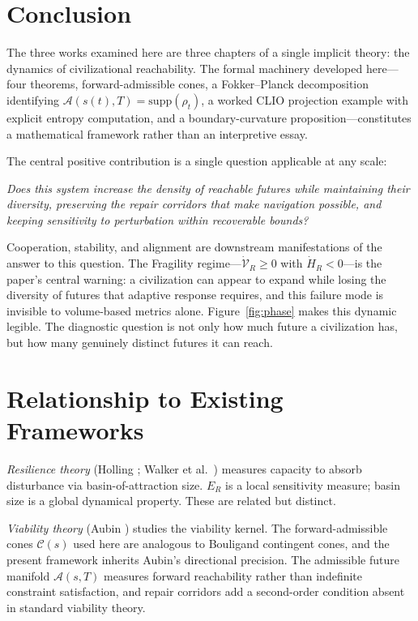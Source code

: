 \documentclass[12pt, a4paper]{article}
\theoremstyle{plain}
\theoremstyle{definition}
\theoremstyle{remark}
\begin{document}
\section{Conclusion}

The three works examined here are three chapters of a single implicit theory: the dynamics of civilizational reachability. The formal machinery developed here---four theorems, forward-admissible cones, a Fokker--Planck decomposition identifying $\mathcal{A}(s(t),T) = \mathrm{supp}(\rho_t)$, a worked CLIO projection example with explicit entropy computation, and a boundary-curvature proposition---constitutes a mathematical framework rather than an interpretive essay.

The central positive contribution is a single question applicable at any scale:

\begin{center}
\textit{Does this system increase the density of reachable futures while maintaining their diversity, preserving the repair corridors that make navigation possible, and keeping sensitivity to perturbation within recoverable bounds?}
\end{center}

Cooperation, stability, and alignment are downstream manifestations of the answer to this question. The Fragility regime---$\dot{\mathcal{V}}_R \geq 0$ with $\dot{H}_R < 0$---is the paper's central warning: a civilization can appear to expand while losing the diversity of futures that adaptive response requires, and this failure mode is invisible to volume-based metrics alone. Figure~\ref{fig:phase} makes this dynamic legible. The diagnostic question is not only how much future a civilization has, but how many genuinely distinct futures it can reach.

\appendix

\section{Relationship to Existing Frameworks}

\textit{Resilience theory} (Holling \cite{holling1973}; Walker et al.\ \cite{walker2004}) measures capacity to absorb disturbance via basin-of-attraction size. $E_R$ is a local sensitivity measure; basin size is a global dynamical property. These are related but distinct.

\textit{Viability theory} (Aubin \cite{aubin1991}) studies the viability kernel. The forward-admissible cones $\mathcal{C}(s)$ used here are analogous to Bouligand contingent cones, and the present framework inherits Aubin's directional precision. The admissible future manifold $\mathcal{A}(s,T)$ measures forward reachability rather than indefinite constraint satisfaction, and repair corridors add a second-order condition absent in standard viability theory.
\end{document}
